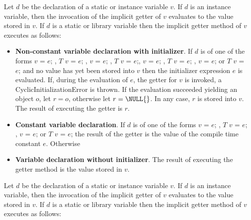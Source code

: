 \documentclass{article}
\newcommand{\code}[1]{{\sf #1}}
\begin{document}

\LMHash{}
Let $d$ be the declaration of a static or instance variable $v$.  If $d$ is an instance variable, then the invocation of the implicit getter  of $v$ evaluates to the value stored in $v$.
If $d$ is a static or library variable then the implicit getter method of $v$ executes as follows:
\begin{itemize}
\item {\bf Non-constant variable declaration with initializer}. If $d$ is of one of the forms \code{\VAR{} $v$ = $e$;} ,  \code{$T$ $v$ = $e$;} ,   \code{\FINAL{} $v$ = $e$;} ,  \code{\FINAL{} $T$ $v$ = $e$;}, \code{\STATIC{} $v$ = $e$; }, \code{\STATIC{} $T$ $v$ = $e$; }, \code{\STATIC{} \FINAL{} $v$ = $e$; } or \code{\STATIC{} \FINAL{} $T$ $v$ = $e$;} and no value has yet been stored into $v$ then the initializer expression $e$ is evaluated. If, during the evaluation of $e$, the getter for $v$ is invoked, a \code{CyclicInitializationError} is thrown. If the evaluation succeeded yielding an object $o$, let $r = o$, otherwise let $r = \NULL{}$. In any case, $r$ is stored into $v$. The result of executing the getter is $r$.
\item  {\bf Constant variable declaration}. If $d$ is of one of the forms \code{\CONST{} $v$ = $e$; } ,  \code{\CONST{} $T$  $v$ = $e$; },  \code{\STATIC{} \CONST{} $v$ = $e$; }  or \code{\STATIC{} \CONST{} $T$ $v$ = $e$;} the result of the getter is the value of the compile time constant $e$. 
Otherwise
\item {\bf Variable declaration without initializer}. The result of executing the getter method is the value stored in $v$.
\end{itemize}

\LMHash{}
Let $d$ be the declaration of a static or instance variable $v$.  If $d$ is an instance variable, then the invocation of the implicit getter  of $v$ evaluates to the value stored in $v$.
If $d$ is a static or library variable then the implicit getter method of $v$ executes as follows:

\end{document}
